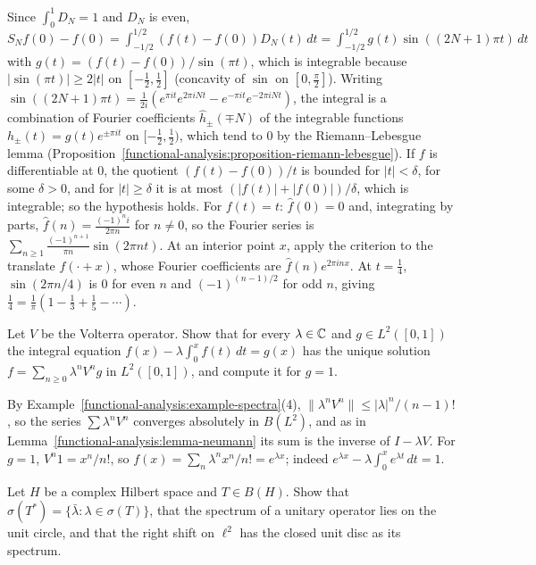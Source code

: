 \begin{solution}
Since $\int_0^1D_N = 1$ and $D_N$ is even, $S_Nf(0) - f(0) = \int_{-1/2}^{1/2}(f(t) - f(0))D_N(t)\,dt = \int_{-1/2}^{1/2}g(t)\sin((2N + 1)\pi t)\,dt$ with $g(t) = (f(t) - f(0))/\sin(\pi t)$, which is
integrable because $|\sin(\pi t)| \geq 2|t|$ on $[-\frac12, \frac12]$ (concavity of $\sin$ on $[0, \frac\pi2]$). Writing $\sin((2N + 1)\pi t) = \frac{1}{2i}(e^{\pi it}e^{2\pi iNt} - e^{-\pi it}e^{-2\pi iNt})$, the integral is a
combination of Fourier coefficients $\hat h_\pm(\mp N)$ of the integrable functions $h_\pm(t) = g(t)e^{\pm\pi it}$ on $[-\frac12, \frac12)$, which tend to $0$ by the Riemann--Lebesgue lemma
(Proposition~\ref{functional-analysis:proposition-riemann-lebesgue}). If $f$ is differentiable at $0$, the quotient $(f(t) - f(0))/t$ is bounded for $|t| < \delta$, for some $\delta > 0$, and for $|t| \geq \delta$ it is at most $(|f(t)| + |f(0)|)/\delta$, which is
integrable; so the hypothesis holds.
For $f(t) = t$: $\hat f(0) = 0$ and, integrating by parts, $\hat f(n) = \frac{(-1)^ni}{2\pi n}$ for $n \neq 0$, so the Fourier series is $\sum_{n \geq 1}\frac{(-1)^{n+1}}{\pi n}\sin(2\pi nt)$. At an interior point
$x$, apply the criterion to the translate $f(\cdot + x)$, whose Fourier coefficients are $\hat f(n)e^{2\pi inx}$. At $t = \frac14$, $\sin(2\pi n/4)$ is $0$ for even $n$ and $(-1)^{(n-1)/2}$ for odd $n$, giving
$\frac14 = \frac1\pi(1 - \frac13 + \frac15 - \cdots)$.
\end{solution}

\begin{exercise}\label{functional-analysis:exercise-volterra-equation}
Let $V$ be the Volterra operator. Show that for every $\lambda \in \mathbb{C}$ and $g \in L^2([0, 1])$ the integral equation $f(x) - \lambda\int_0^xf(t)\,dt = g(x)$ has the unique solution
$f = \sum_{n \geq 0}\lambda^nV^ng$ in $L^2([0, 1])$, and compute it for $g = 1$.
\end{exercise}

\begin{solution}
By Example~\ref{functional-analysis:example-spectra}(4), $\|\lambda^nV^n\| \leq |\lambda|^n/(n - 1)!$, so the series $\sum\lambda^nV^n$ converges absolutely in $B(L^2)$, and as in Lemma~\ref{functional-analysis:lemma-neumann} its sum is
the inverse of $I - \lambda V$. For $g = 1$, $V^n1 = x^n/n!$, so $f(x) = \sum_n\lambda^nx^n/n! = e^{\lambda x}$; indeed $e^{\lambda x} - \lambda\int_0^xe^{\lambda t}\,dt = 1$.
\end{solution}

\begin{exercise}\label{functional-analysis:exercise-spectrum-adjoint}
Let $H$ be a complex Hilbert space and $T \in B(H)$. Show that $\sigma(T^*) = \{\bar\lambda : \lambda \in \sigma(T)\}$, that the spectrum of a unitary operator lies on the unit circle, and that the right
shift on $\ell^2$ has the closed unit disc as its spectrum.
\end{exercise}

